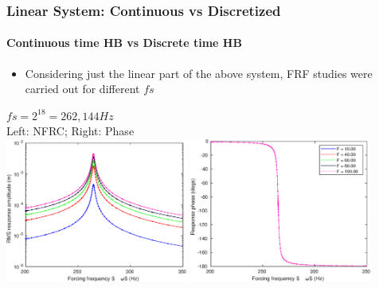 \documentclass[9pt]{beamer}
\begin{document}
\begin{frame}
  \frametitle{Linear System: Continuous vs Discretized}
  \framesubtitle{Continuous time HB vs Discrete time HB}
  \begin{itemize}
  \item Considering just the linear part of the above system, FRF
    studies were carried out for different $fs$
  \end{itemize}
  \begin{center}
    $fs = 2^{18} = 262,144 Hz$\\
   Left: NFRC; Right: Phase\\
   \includegraphics[width=0.45\textwidth]{../../benchmark0/fig/dssex_frf_Amp_fs262144}
   \includegraphics[width=0.45\textwidth]{../../benchmark0/fig/dssex_frf_Phase_fs262144}
  \end{center}  
\end{frame}
\end{document}
